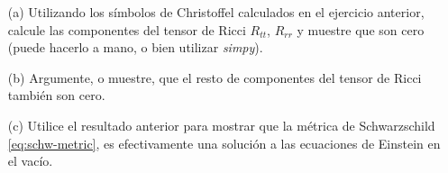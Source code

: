 
\question[2] 

\begin{itemize}
\item[(a)] Utilizando los símbolos de Christoffel calculados en el ejercicio anterior,
  calcule las componentes del tensor de Ricci $R_{tt}$, $R_{rr}$ y muestre que
  son cero (puede hacerlo a mano, o bien utilizar \textit{simpy}).
\item[(b)] Argumente, o muestre, que el resto de componentes del tensor de Ricci
  también son cero.
\item[(c)] Utilice el resultado anterior para mostrar que la métrica de
  Schwarzschild \eqref{eq:schw-metric}, es efectivamente una solución a las ecuaciones de Einstein en el
  vacío.
\end{itemize}

\droptotalpoints
